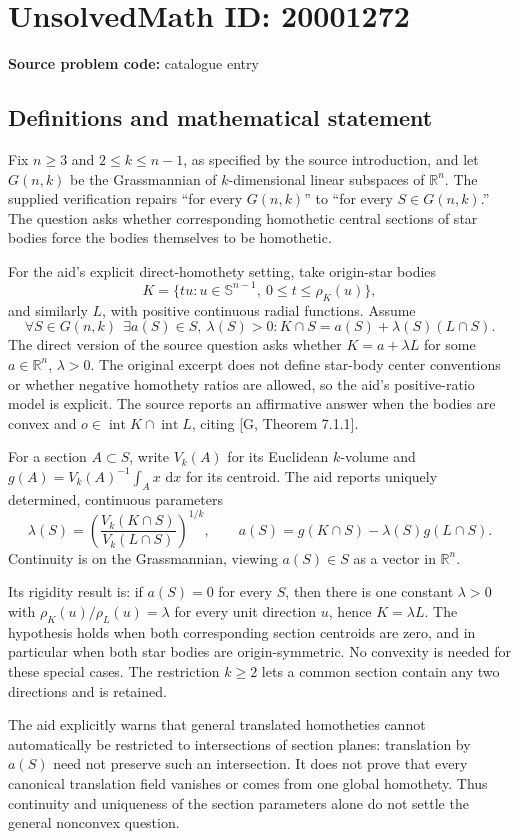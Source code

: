 \documentclass[11pt]{article}
\newcommand{\R}{\mathbb{R}}
\newcommand{\dd}{\,\mathrm{d}}
\begin{document}
\section*{UnsolvedMath ID: 20001272}
\textbf{Source problem code:} catalogue entry
\subsection{Definitions and mathematical statement}
Fix \(n\ge3\) and \(2\le k\le n-1\), as specified by the source introduction, and let \(G(n,k)\) be the Grassmannian of \(k\)-dimensional linear subspaces of \(\R^n\). The supplied verification repairs ``for every \(G(n,k)\)'' to ``for every \(S\in G(n,k)\).'' The question asks whether corresponding homothetic central sections of star bodies force the bodies themselves to be homothetic.

For the aid's explicit direct-homothety setting, take origin-star bodies
\[
 K=\{tu:u\in\mathbb S^{n-1},\ 0\le t\le\rho_K(u)\},
\]
and similarly \(L\), with positive continuous radial functions. Assume
\[
 \forall S\in G(n,k)\ \ \exists a(S)\in S,\ \lambda(S)>0:
 K\cap S=a(S)+\lambda(S)(L\cap S).
\]
The direct version of the source question asks whether \(K=a+\lambda L\) for some \(a\in\R^n\), \(\lambda>0\). The original excerpt does not define star-body center conventions or whether negative homothety ratios are allowed, so the aid's positive-ratio model is explicit. The source reports an affirmative answer when the bodies are convex and \(o\in\operatorname{int}K\cap\operatorname{int}L\), citing [G, Theorem 7.1.1].

For a section \(A\subset S\), write \(V_k(A)\) for its Euclidean \(k\)-volume and \(g(A)=V_k(A)^{-1}\int_Ax\,\dd x\) for its centroid. The aid reports uniquely determined, continuous parameters
\[
 \lambda(S)=\left(\frac{V_k(K\cap S)}{V_k(L\cap S)}\right)^{1/k},
 \qquad
 a(S)=g(K\cap S)-\lambda(S)g(L\cap S).
\]
Continuity is on the Grassmannian, viewing \(a(S)\in S\) as a vector in \(\R^n\).

Its rigidity result is: if \(a(S)=0\) for every \(S\), then there is one constant \(\lambda>0\) with \(\rho_K(u)/\rho_L(u)=\lambda\) for every unit direction \(u\), hence \(K=\lambda L\). The hypothesis holds when both corresponding section centroids are zero, and in particular when both star bodies are origin-symmetric. No convexity is needed for these special cases. The restriction \(k\ge2\) lets a common section contain any two directions and is retained.

The aid explicitly warns that general translated homotheties cannot automatically be restricted to intersections of section planes: translation by \(a(S)\) need not preserve such an intersection. It does not prove that every canonical translation field vanishes or comes from one global homothety. Thus continuity and uniqueness of the section parameters alone do not settle the general nonconvex question.
\end{document}
